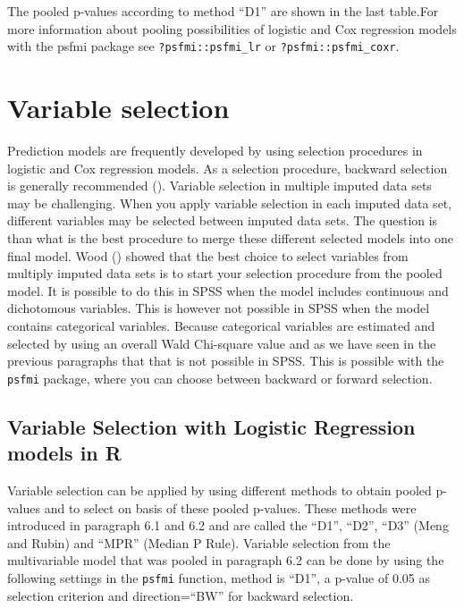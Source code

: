 \documentclass[
]{book}
\begin{document}
The pooled p-values according to method ``D1'' are shown in the last table.For more information about pooling possibilities of logistic and Cox regression models with the psfmi package see \texttt{?psfmi::psfmi\_lr} or \texttt{?psfmi::psfmi\_coxr}.

\hypertarget{variable-selection}{%
\section{Variable selection}\label{variable-selection}}

Prediction models are frequently developed by using selection procedures in logistic and Cox regression models. As a selection procedure, backward selection is generally recommended (\citet{Moons2015}). Variable selection in multiple imputed data sets may be challenging. When you apply variable selection in each imputed data set, different variables may be selected between imputed data sets. The question is than what is the best procedure to merge these different selected models into one final model. Wood (\citet{Wood2008}) showed that the best choice to select variables from multiply imputed data sets is to start your selection procedure from the pooled model. It is possible to do this in SPSS when the model includes continuous and dichotomous variables. This is however not possible in SPSS when the model contains categorical variables. Because categorical variables are estimated and selected by using an overall Wald Chi-square value and as we have seen in the previous paragraphs that that is not possible in SPSS. This is possible with the \texttt{psfmi} package, where you can choose between backward or forward selection.

\hypertarget{variable-selection-with-logistic-regression-models-in-r}{%
\subsection{Variable Selection with Logistic Regression models in R}\label{variable-selection-with-logistic-regression-models-in-r}}

Variable selection can be applied by using different methods to obtain pooled p-values and to select on basis of these pooled p-values. These methods were introduced in paragraph 6.1 and 6.2 and are called the ``D1'', ``D2'', ``D3'' (Meng and Rubin) and ``MPR'' (Median P Rule). Variable selection from the multivariable model that was pooled in paragraph 6.2 can be done by using the following settings in the \texttt{psfmi} function, method is ``D1'', a p-value of 0.05 as selection criterion and direction=``BW'' for backward selection.
\end{document}
